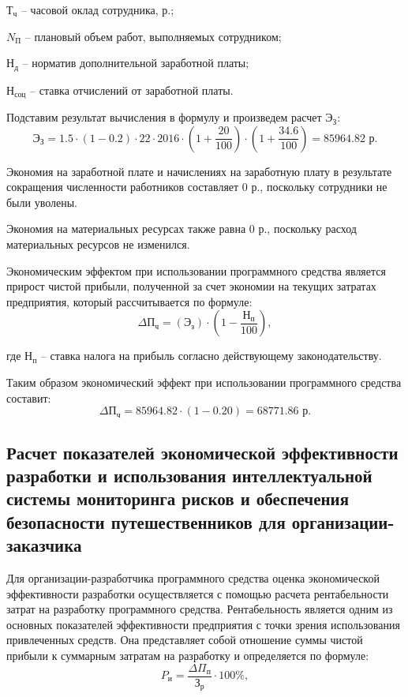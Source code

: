     $\text{Т}_{\text{ч}}$ -- часовой оклад сотрудника, р.;

    $N_{\text{П}}$ -- плановый объем работ, выполняемых сотрудником;

    $\text{Н}_{\text{д}}$ -- норматив дополнительной заработной платы;

    $\text{Н}_{\text{соц}}$ -- ставка отчислений от заработной платы.

Подставим результат вычисления в формулу и произведем расчет $\text{Э}_{\text{З}}$:
$$
    \text{Э}_{\text{З}} = 1.5 \cdot (1 - 0.2) \cdot 22\cdot 2016 \cdot  (1+\frac{20}{100})\cdot (1+\frac{34.6}{100}) = 85964.82 \text{ р}.
$$

Экономия на заработной плате и начислениях на заработную плату в результате сокращения численности работников составляет 0 р., поскольку сотрудники не были уволены.

Экономия на материальных ресурсах также равна 0 р., поскольку расход материальных ресурсов не изменился.

Экономическим эффектом при использовании программного средства является прирост чистой прибыли, полученной за счет экономии на текущих затратах предприятия, который рассчитывается по формуле:
\begin{equation}
    \Delta \text{П}_{\text{ч}} = (\text{Э}_{\text{з}})\cdot (1 - \frac{\text{Н}_{\text{п}}}{100}),
\end{equation}

где $\text{Н}_{\text{п}}$ -- ставка налога на прибыль согласно действующему законодательству.

Таким образом экономический эффект при использовании программного средства составит:
$$
    \Delta \text{П}_{\text{ч}} = 85964.82\cdot (1 - 0.20) = 68771.86 \text{ р}.
$$

\subsection{Расчет показателей экономической эффективности разработки и использования интеллектуальной системы мониторинга рисков и обеспечения безопасности путешественников для организации-заказчика}

Для организации-разработчика программного средства оценка экономической эффективности разработки осуществляется с помощью расчета рентабельности затрат на разработку программного средства. Рентабельность является одним из основных показателей эффективности предприятия с точки зрения использования привлеченных средств. Она представляет собой отношение суммы чистой прибыли к суммарным затратам на разработку и определяется по формуле:
\begin{equation}
    P_{\text{и}} = \frac{\Delta\Pi_{\text{п}}}{\text{З}_{\text{р}}} \cdot 100\%,
\end{equation}

